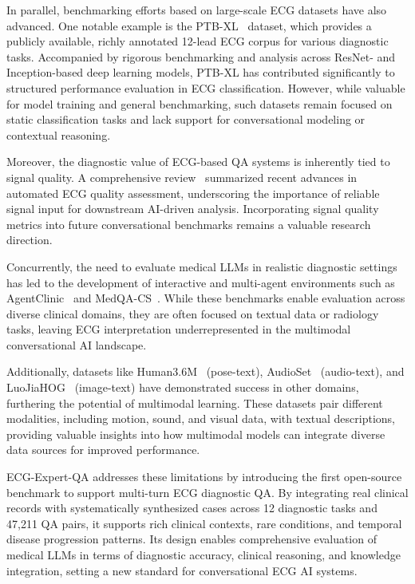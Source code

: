 In parallel, benchmarking efforts based on large-scale ECG datasets have also advanced. One notable example is the PTB-XL~\cite{bibPTBXL} dataset, which provides a publicly available, richly annotated 12-lead ECG corpus for various diagnostic tasks. Accompanied by rigorous benchmarking and analysis across ResNet- and Inception-based deep learning models, PTB-XL has contributed significantly to structured performance evaluation in ECG classification. However, while valuable for model training and general benchmarking, such datasets remain focused on static classification tasks and lack support for conversational modeling or contextual reasoning.

Moreover, the diagnostic value of ECG-based QA systems is inherently tied to signal quality. A comprehensive review~\cite{bibQualityReview} summarized recent advances in automated ECG quality assessment, underscoring the importance of reliable signal input for downstream AI-driven analysis. Incorporating signal quality metrics into future conversational benchmarks remains a valuable research direction.

Concurrently, the need to evaluate medical LLMs in realistic diagnostic settings has led to the development of interactive and multi-agent environments such as AgentClinic~\cite{bib5} and MedQA-CS~\cite{bib6}. While these benchmarks enable evaluation across diverse clinical domains, they are often focused on textual data or radiology tasks, leaving ECG interpretation underrepresented in the multimodal conversational AI landscape.

Additionally, datasets like Human3.6M~\cite{bibH36M1,bibH36M2} (pose-text), AudioSet~\cite{bibAudioSet} (audio-text), and LuoJiaHOG~\cite{bibLuoJiaHOG} (image-text) have demonstrated success in other domains, furthering the potential of multimodal learning. These datasets pair different modalities, including motion, sound, and visual data, with textual descriptions, providing valuable insights into how multimodal models can integrate diverse data sources for improved performance.

ECG-Expert-QA addresses these limitations by introducing the first open-source benchmark to support multi-turn ECG diagnostic QA. By integrating real clinical records with systematically synthesized cases across 12 diagnostic tasks and 47,211 QA pairs, it supports rich clinical contexts, rare conditions, and temporal disease progression patterns. Its design enables comprehensive evaluation of medical LLMs in terms of diagnostic accuracy, clinical reasoning, and knowledge integration, setting a new standard for conversational ECG AI systems.